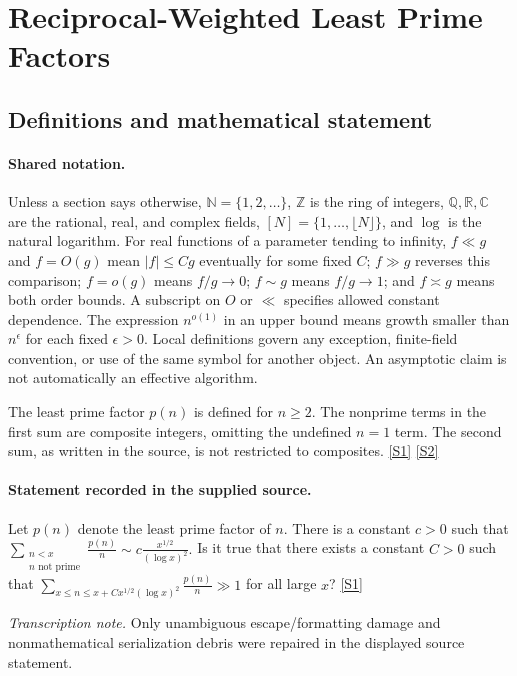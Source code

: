 \documentclass[11pt,a4paper]{article}
\newcommand{\N}{\mathbb{N}}
\newcommand{\Z}{\mathbb{Z}}
\newcommand{\Q}{\mathbb{Q}}
\newcommand{\R}{\mathbb{R}}
\newcommand{\C}{\mathbb{C}}
\newcommand{\sref}[2]{\hyperlink{source:#1:#2}{[S#2]}}
\begin{document}
\section{Reciprocal-Weighted Least Prime Factors}\label{statement}


\subsection{Definitions and mathematical statement}

\paragraph{Shared notation.}Unless a section says otherwise, $\N=\{1,2,\ldots\}$,
$\Z$ is the ring of integers, $\Q,\R,\C$ are the rational, real, and complex
fields, $[N]=\{1,\ldots,\lfloor N\rfloor\}$, and $\log$ is the natural
logarithm. For real functions of a parameter tending to infinity,
$f\ll g$ and $f=O(g)$ mean $|f|\leq Cg$ eventually for some fixed $C$;
$f\gg g$ reverses this comparison; $f=o(g)$ means $f/g\to0$;
$f\sim g$ means $f/g\to1$; and $f\asymp g$ means both order bounds.
A subscript on $O$ or $\ll$ specifies allowed constant dependence.
The expression $n^{o(1)}$ in an upper bound means growth smaller than
$n^\epsilon$ for each fixed $\epsilon>0$. Local definitions govern any
exception, finite-field convention, or use of the same symbol for another
object. An asymptotic claim is not automatically an effective algorithm.



The least prime factor $p(n)$ is defined for $n\geq2$. The nonprime terms in the first sum are composite integers, omitting the undefined $n=1$ term. The second sum, as written in the source, is not restricted to composites. \sref{statement}{1} \sref{statement}{2}

\paragraph{Statement recorded in the supplied source.}
Let $p(n)$ denote the least prime factor of $n$. There is a constant $c>0$ such that $ \sum_{\substack{n<x\\ n\textrm{ not prime}}}\frac{p(n)}{n}\sim c\frac{x^{1/2}}{(\log x)^2}. $ Is it true that there exists a constant $C>0$ such that $ \sum_{x\leq n\leq x+Cx^{1/2}(\log x)^2}\frac{p(n)}{n} \gg 1 $ for all large $x$? \sref{statement}{1}

{\small\emph{Transcription note.} Only unambiguous escape/formatting damage and nonmathematical serialization debris were repaired in the displayed source statement.}
\end{document}
